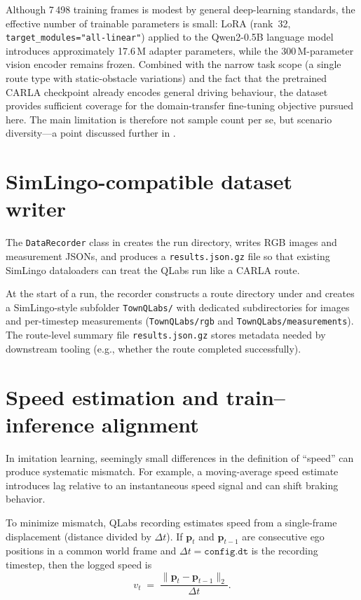 Although 7\,498 training frames is modest by general deep-learning standards, the effective number of trainable parameters is small: LoRA (rank~32, \texttt{target\_modules="all-linear"}) applied to the Qwen2-0.5B language model introduces approximately 17.6\,M adapter parameters, while the 300\,M-parameter vision encoder remains frozen. Combined with the narrow task scope (a single route type with static-obstacle variations) and the fact that the pretrained CARLA checkpoint already encodes general driving behaviour, the dataset provides sufficient coverage for the domain-transfer fine-tuning objective pursued here. The main limitation is therefore not sample count per se, but scenario diversity---a point discussed further in .

\section{SimLingo-compatible dataset writer}
\label{sec:data-recorder}
The \texttt{DataRecorder} class in  creates the run directory, writes RGB images and measurement JSONs, and produces a \texttt{results.json.gz} file so that existing SimLingo dataloaders can treat the QLabs run like a CARLA route.

At the start of a run, the recorder constructs a route directory under  and creates a SimLingo-style subfolder \texttt{TownQLabs/} with dedicated subdirectories for images and per-timestep measurements (\texttt{TownQLabs/rgb} and \texttt{TownQLabs/measurements}). The route-level summary file \texttt{results.json.gz} stores metadata needed by downstream tooling (e.g., whether the route completed successfully).

\section{Speed estimation and train--inference alignment}
\label{sec:speed-alignment}
In imitation learning, seemingly small differences in the definition of ``speed'' can produce systematic mismatch. For example, a moving-average speed estimate introduces lag relative to an instantaneous speed signal and can shift braking behavior.

To minimize mismatch, QLabs recording estimates speed from a single-frame displacement (distance divided by $\Delta t$). If $\mathbf{p}_t$ and $\mathbf{p}_{t-1}$ are consecutive ego positions in a common world frame and $\Delta t=\texttt{config.dt}$ is the recording timestep, then the logged speed is
\begin{equation}
 v_t \;=\; \frac{\lVert\mathbf{p}_t-\mathbf{p}_{t-1}\rVert_2}{\Delta t}.
\end{equation}

